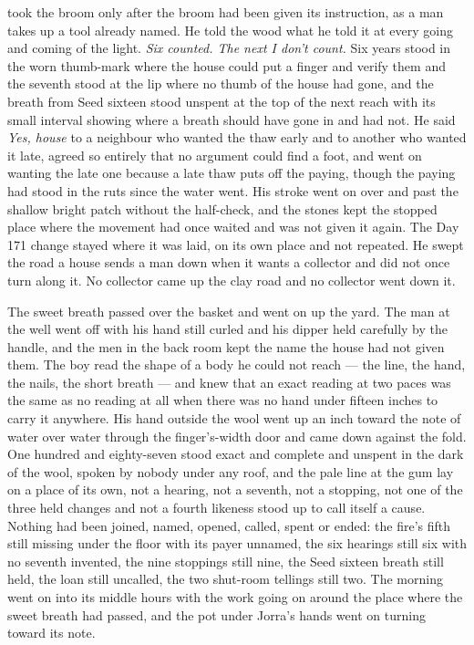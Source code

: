  took the broom only after the broom had been given its instruction, as a man takes up a tool already named. He told the wood what he told it at every going and coming of the light. \emph{Six counted. The next I don't count.} Six years stood in the worn thumb-mark where the house could put a finger and verify them and the seventh stood at the lip where no thumb of the house had gone, and the breath from Seed sixteen stood unspent at the top of the next reach with its small interval showing where a breath should have gone in and had not. He said \emph{Yes, house} to a neighbour who wanted the thaw early and to another who wanted it late, agreed so entirely that no argument could find a foot, and went on wanting the late one because a late thaw puts off the paying, though the paying had stood in the ruts since the water went. His stroke went on over  and past the shallow bright patch without the half-check, and the stones kept the stopped place where the movement had once waited and was not given it again. The Day 171 change stayed where it was laid, on its own place and not repeated. He swept the road a house sends a man down when it wants a collector and did not once turn along it. No collector came up the clay road and no collector went down it.

The sweet breath passed over the basket and went on up the yard. The man at the well went off with his hand still curled and his dipper held carefully by the handle, and the men in the back room kept the name the house had not given them. The boy read the shape of a body he could not reach --- the line, the hand, the nails, the short breath --- and knew that an exact reading at two paces was the same as no reading at all when there was no hand under fifteen inches to carry it anywhere. His hand outside the wool went up an inch toward the note of water over water through the finger's-width door and came down against the fold. One hundred and eighty-seven stood exact and complete and unspent in the dark of the wool, spoken by nobody under any roof, and the pale line at the gum lay on a place of its own, not a hearing, not a seventh, not a stopping, not one of the three held changes and not a fourth likeness stood up to call itself a cause. Nothing had been joined, named, opened, called, spent or ended: the fire's fifth still missing under the floor with its payer unnamed, the six hearings still six with no seventh invented, the nine stoppings still nine, the Seed sixteen breath still held, the loan still uncalled, the two shut-room tellings still two. The morning went on into its middle hours with the work going on around the place where the sweet breath had passed, and the pot under Jorra's hands went on turning toward its note.
